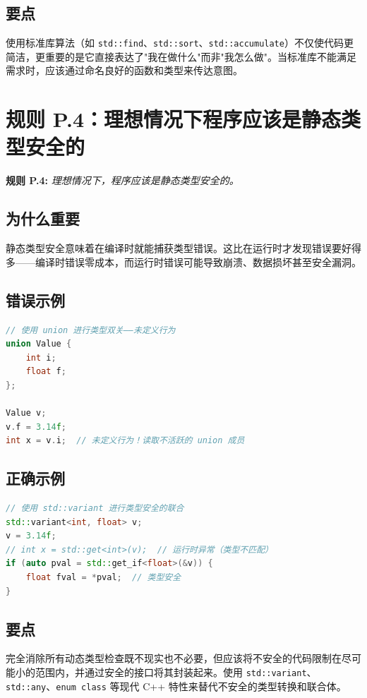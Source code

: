 \subsection{要点}
使用标准库算法（如 \texttt{std::find}、\texttt{std::sort}、\texttt{std::accumulate}）不仅使代码更简洁，更重要的是它直接表达了"我在做什么"而非"我怎么做"。当标准库不能满足需求时，应该通过命名良好的函数和类型来传达意图。

\section{规则 P.4：理想情况下程序应该是静态类型安全的}

\textbf{规则 P.4:} \textit{理想情况下，程序应该是静态类型安全的。}

\subsection{为什么重要}

静态类型安全意味着在编译时就能捕获类型错误。这比在运行时才发现错误要好得多——编译时错误零成本，而运行时错误可能导致崩溃、数据损坏甚至安全漏洞。

\subsection{错误示例}

\begin{lstlisting}[language=C++]
// 使用 union 进行类型双关——未定义行为
union Value {
    int i;
    float f;
};

Value v;
v.f = 3.14f;
int x = v.i;  // 未定义行为！读取不活跃的 union 成员
\end{lstlisting}

\subsection{正确示例}

\begin{lstlisting}[language=C++]
// 使用 std::variant 进行类型安全的联合
std::variant<int, float> v;
v = 3.14f;
// int x = std::get<int>(v);  // 运行时异常（类型不匹配）
if (auto pval = std::get_if<float>(&v)) {
    float fval = *pval;  // 类型安全
}
\end{lstlisting}

\subsection{要点}
完全消除所有动态类型检查既不现实也不必要，但应该将不安全的代码限制在尽可能小的范围内，并通过安全的接口将其封装起来。使用 \texttt{std::variant}、\texttt{std::any}、\texttt{enum class} 等现代 C++ 特性来替代不安全的类型转换和联合体。

